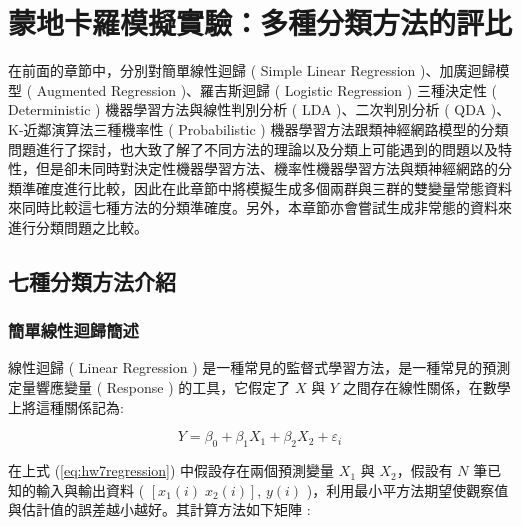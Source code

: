 

 
%
\chapter{{蒙地卡羅模擬實驗：多種分類方法的評比}}

在前面的章節中，分別對簡單線性迴歸 ( Simple Linear Regression )、加廣迴歸模型 ( Augmented Regression )、羅吉斯迴歸 ( Logistic Regression ) 三種決定性 ( Deterministic ) 機器學習方法與線性判別分析 ( LDA )、二次判別分析 ( QDA )、K-近鄰演算法三種機率性 ( Probabilistic ) 機器學習方法跟類神經網路模型的分類問題進行了探討，也大致了解了不同方法的理論以及分類上可能遇到的問題以及特性，但是卻未同時對決定性機器學習方法、機率性機器學習方法與類神經網路的分類準確度進行比較，因此在此章節中將模擬生成多個兩群與三群的雙變量常態資料來同時比較這七種方法的分類準確度。另外，本章節亦會嘗試生成非常態的資料來進行分類問題之比較。

\section{七種分類方法介紹}

\subsection{簡單線性迴歸簡述}

線性迴歸 ( Linear Regression ) 是一種常見的監督式學習方法，是一種常見的預測定量響應變量 ( Response ) 的工具，它假定了 $X$ 與 $Y$ 之間存在線性關係，在數學上將這種關係記為:

\begin{equation}\label{eq:hw7regression}
Y = \beta_0 + \beta_1 X_1 +\beta_2 X_2 + \varepsilon_i
\end{equation} 

在上式 (\ref{eq:hw7regression}) 中假設存在兩個預測變量 $X_1$ 與 $X_2$，假設有 $N$ 筆已知的輸入與輸出資料 ( $\left[ x_1(i) \; x_2(i) \right]$, $y(i)$ )，利用最小平方法期望使觀察值與估計值的誤差越小越好。其計算方法如下矩陣 :

